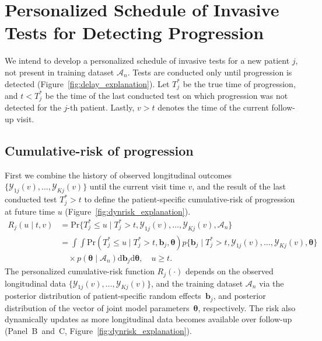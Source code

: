 \section{Personalized Schedule of Invasive Tests for Detecting Progression}
\label{sec:schedule}
We intend to develop a personalized schedule of invasive tests for a new patient $j$, not present in training dataset $\mathcal{A}_n$. Tests are conducted only until progression is detected (Figure~\ref{fig:delay_explanation}). Let $T^*_j$ be the true time of progression, and ${t < T^*_j}$ be the time of the last conducted test on which progression was not detected for the $j$-th patient. Lastly, ${v > t}$ denotes the time of the current follow-up visit.

\subsection{Cumulative-risk of progression}
\label{subsec:cum_risk}
First we combine the history of observed longitudinal outcomes $\{\mathcal{Y}_{1j}(v), \ldots, \mathcal{Y}_{Kj}(v)\}$ until the current visit time $v$, and the result of the last conducted test ${T^*_j > t}$ to define the patient-specific cumulative-risk of progression at future time $u$ (Figure~\ref{fig:dynrisk_explanation}).
\begin{equation}
\label{eq:cumulative_risk}
\begin{split}
R_j(u \mid t, v) &= \mbox{Pr}\big\{T^*_j \leq u \mid T^*_j > t, \mathcal{Y}_{1j}(v), \ldots, \mathcal{Y}_{Kj}(v), \mathcal{A}_n\big\}\\
&=\int \int \mbox{Pr}(T^*_j \leq u \mid T^*_j > t, \boldsymbol{b}_{j}, \boldsymbol{\theta}) p\big\{\boldsymbol{b}_j \mid T^*_j > t, \mathcal{Y}_{1j}(v), \ldots, \mathcal{Y}_{Kj}(v), \boldsymbol{\theta} \big\}\\
&\quad \times p(\boldsymbol{\theta} \mid \mathcal{A}_n) \mathrm{d}\boldsymbol{b}_j \mathrm{d}\boldsymbol{\theta}, \quad u \geq t.
\end{split}
\end{equation}
The personalized cumulative-risk function $R_j(\cdot)$ depends on the observed longitudinal data $\{\mathcal{Y}_{1j}(v), \ldots, \mathcal{Y}_{Kj}(v)\}$, and the training dataset $\mathcal{A}_n$ via the posterior distribution of patient-specific random effects~$\boldsymbol{b}_j$, and posterior distribution of the vector of joint model parameters~$\boldsymbol{\theta}$, respectively. The risk also dynamically updates as more longitudinal data becomes available over follow-up (Panel~B~and~C, Figure~\ref{fig:dynrisk_explanation}).

